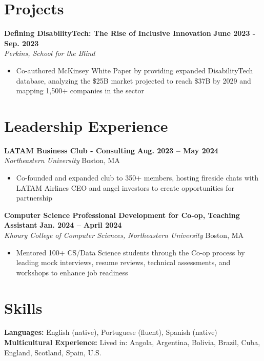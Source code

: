 \documentclass[a4paper,10.5pt]{article}
\begin{document}
\section{Projects}

\textbf{Defining DisabilityTech: The Rise of Inclusive Innovation} \hfill \textbf{June 2023 - Sep. 2023} \\
\textit{Perkins, School for the Blind} \vspace{-2mm}
\begin{itemize}[noitemsep, label={$\bullet$}]
    \item Co-authored McKinsey White Paper by providing expanded DisabilityTech database, analyzing the \$25B market projected to reach \$37B by 2029 and mapping 1,500+ companies in the sector
\end{itemize}



\section{Leadership Experience}

\textbf{LATAM Business Club - Consulting} \hfill \textbf{Aug. 2023 -- May 2024} \\
\textit{Northeastern University} \hfill Boston, MA \vspace{-2mm}
\begin{itemize}[noitemsep, label={$\bullet$}]
    \item Co-founded and expanded club to 350+ members, hosting fireside chats with LATAM Airlines CEO and angel investors to create opportunities for partnership
\end{itemize}

\textbf{Computer Science Professional Development for Co-op, Teaching Assistant} \hfill \textbf{Jan. 2024 -- April 2024} \\
\textit{Khoury College of Computer Sciences, Northeastern University} \hfill Boston, MA \vspace{-2mm}
\begin{itemize}[noitemsep, label={$\bullet$}]
    \item Mentored 100+ CS/Data Science students through the Co-op process by leading mock interviews, resume reviews, technical assessments, and workshops to enhance job readiness 
\end{itemize}


\section{Skills}
\textbf{Languages:}  English (native), Portuguese (fluent), Spanish (native) \\
\textbf{Multicultural Experience:} Lived in: Angola, Argentina, Bolivia, Brazil, Cuba, England, Scotland, Spain, U.S.
\end{document}
